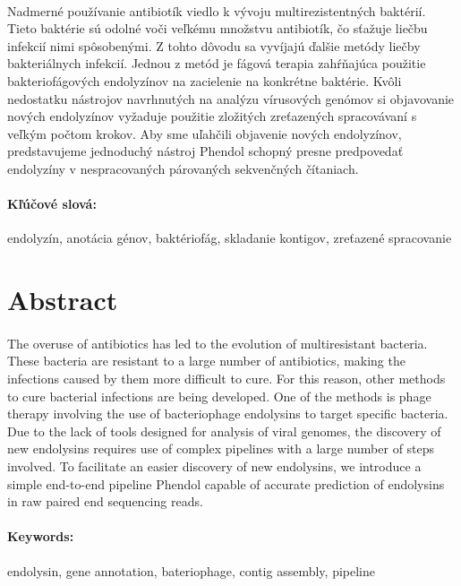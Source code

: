 \documentclass[12pt, twoside]{book}
\begin{document}
\paragraph*{}
Nadmerné používanie antibiotík viedlo k vývoju multirezistentných baktérií. Tieto baktérie sú odolné voči veľkému množstvu antibiotík, čo sťažuje liečbu infekcií nimi spôsobenými. Z tohto dôvodu sa vyvíjajú ďalšie metódy liečby bakteriálnych infekcií. Jednou z metód je fágová terapia zahŕňajúca použitie bakteriofágových endolyzínov na zacielenie na konkrétne baktérie. Kvôli nedostatku nástrojov navrhnutých na analýzu vírusových genómov si objavovanie nových endolyzínov vyžaduje použitie zložitých zreťazených spracovávaní s veľkým počtom krokov. Aby sme uľahčili objavenie nových endolyzínov, predstavujeme jednoduchý nástroj Phendol schopný presne predpovedať endolyzíny v nespracovaných párovaných sekvenčných čítaniach.

\paragraph*{Kľúčové slová:} endolyzín, anotácia génov, baktériofág, skladanie kontigov, zreťazené spracovanie


\newpage 
\section*{Abstract}
\paragraph*{}
The overuse of antibiotics has led to the evolution of multiresistant bacteria. These bacteria are resistant to a large number of antibiotics, making the infections caused by them more difficult to cure. For this reason, other methods to cure bacterial infections are being developed. One of the methods is phage therapy involving the use of bacteriophage endolysins to target specific bacteria. Due to the lack of tools designed for analysis of viral genomes, the discovery of new endolysins requires use of complex pipelines with a large number of steps involved. To facilitate an easier discovery of new endolysins, we introduce a simple end-to-end pipeline Phendol capable of accurate prediction of endolysins in raw paired end sequencing reads.

\paragraph*{Keywords:} endolysin, gene annotation, bateriophage, contig assembly, pipeline
\end{document}
